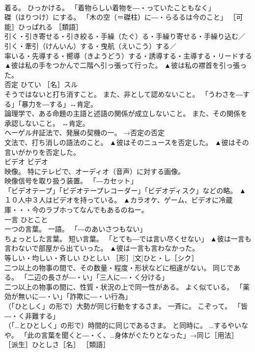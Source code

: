 \documentclass[8pt]{extreport}
\begin{document}
\begin{CJK}{UTF8}{min}
\\	着る。 ひっかける。 「着物らしい着物を―・っていたこともなく」 
\\	磔（はりつけ）にする。 「木の空（＝磔柱）に―・らるるは今のこと」 ［可能］ひっぱれる ［類語］
\\	引く・引き寄せる・引き絞る・手繰（たぐ）る・手繰り寄せる・手繰り込む／
\\	引く・牽引（けんいん）する・曳航（えいこう）する／
\\	率いる・先導する・嚮導（きようどう）する・誘導する・主導する・リードする	▲彼は私の手をつかんで二階へ引っ張って行った。 ▲彼は私の襟首を引っ張った。
\\	否定	ひてい	［名］スル 
\\	そうではないと打ち消すこと。 また、非として認めないこと。 「うわさを―する」「暴力を―する」↔肯定。 
\\	論理学で、ある命題の主語と述語の関係が成立しないこと。 また、その関係を承認しないこと。 ↔肯定。 
\\	ヘーゲル弁証法で、発展の契機の一。 →否定の否定 
\\	文法で、打ち消しの語法のこと。	▲彼はそのニュースを否定した。 ▲彼はその言いがかりを否定した。
\\	ビデオ	ビデオ	
\\	映像。 特にテレビで、オーディオ（音声）に対する画像。 
\\	映像信号を取り扱う装置。 「―カセット」 
\\	「ビデオテープ」「ビデオテープレコーダー」「ビデオディスク」などの略。	▲１０人中３人はビデオを持っている。 ▲カラオケ、ゲーム、ビデオに冷蔵庫・・・今のラブホってなんでもあるのねー。
\\	一言	ひとこと	
\\	一つの言葉。 一語。 「―のあいさつもない」 
\\	ちょっとした言葉。 短い言葉。 「とても―では言い尽くせない」	▲彼は一言も言わないで部屋から出ていった。 ▲彼は一言も言わなかった。
\\	等しい・均しい・斉しい	ひとしい	［形］[文]ひと・し［シク］ 
\\	二つ以上の物事の間で、その数量・程度・形状などに相違がない。 同じである。 「二辺の長さが―・い」「三人に―・く分ける」 
\\	二つ以上の物事の間に、性質・状況の上で同一性がある。 よく似ている。 「薬効が無いに―・い」「詐欺に―・い行為」 
\\	（「ひとしく」の形で）大勢が同じ行動をするさま。 一斉に。 こぞって。 「皆―・く非難する」 
\\	（「…とひとしく」の形で）時間的に同じであるさま。 と同時に。 …するやいなや。 「此の言葉を聞くと―・く、…身体がぐたりとなった」→同じ［用法］ ［派生］ひとしさ［名］ ［類語］

\end{CJK}
\end{document}
